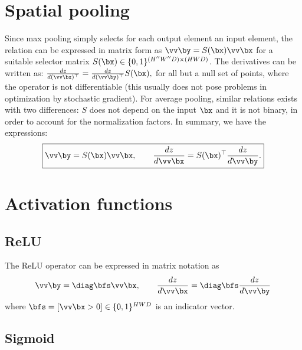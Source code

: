 \section{Spatial pooling}\label{s:impl-pooling}

Since max pooling simply selects for each output element an input element, the relation can be expressed in matrix form as
$
    \vv\by = S(\bx) \vv \bx
$
for a suitable selector matrix $S(\bx)\in\{0,1\}^{(H''W''D) \times (HWD)}$. The derivatives can be written as:
$
\frac{d z}{d (\vv \bx)^\top}
=
\frac{d z}{d (\vv \by)^\top}
S(\bx),
$
for all but a null set of points, where the operator is not differentiable (this usually does not pose problems in optimization by stochastic gradient). For average pooling, similar relations exists with two differences: $S$ does not depend on the input $\bx$ and it is not binary, in order to account for the normalization factors. In summary, we have the expressions:
\begin{equation}\label{e:max-mat}
\boxed{
\vv\by = S(\bx) \vv \bx,
\qquad
\frac{d z}{d \vv \bx}
=
S(\bx)^\top
\frac{d z}{d \vv \by}.
}
\end{equation}



\section{Activation functions}\label{s:impl-activation}

\subsection{ReLU}\label{s:impl-relu}

The ReLU operator can be expressed in matrix notation as
\[
\vv\by = \diag\bfs \vv \bx,
\qquad
\frac{d z}{d \vv \bx}
=
\diag\bfs
\frac{d z}{d \vv \by}
\]
where $\bfs = [\vv \bx > 0] \in\{0,1\}^{HWD}$ is an indicator vector.

\subsection{Sigmoid}\label{s:impl-sigmoid}

